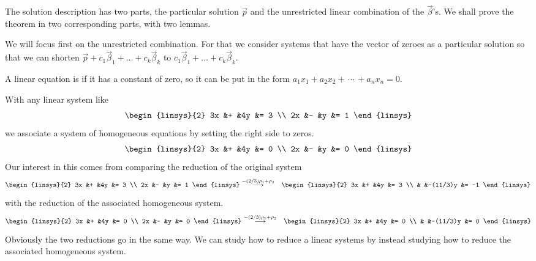 The solution description has two parts, 
the particular solution $\vec{p}$ 
and the unrestricted linear combination of the $\vec{\beta}$'s.
We shall prove the theorem in two corresponding parts, with two lemmas.

We will focus first on the unrestricted combination.
For that we consider systems that have the vector of zeroes
as a particular solution
so that we can shorten $\vec{p}+c_1\vec{\beta}_1+\dots+c_k\vec{\beta}_k$
to $c_1\vec{\beta}_1+\dots+c_k\vec{\beta}_k$.

\begin{definition}
A linear equation is %
 if it has a constant of zero, so
it can be put in the form $a_1x_1+a_2x_2+\,\cdots\,+a_nx_n=0$.
\end{definition}

\begin{example}  \label{ex:FirstExHomoSys}
With any linear system like
\begin{equation*}
  \begin{linsys}{2}
    3x  &+  &4y  &=  3  \\
    2x  &-  &y   &=  1  
  \end{linsys}
\end{equation*}
we associate a system of homogeneous equations by setting the right side to
zeros.
\begin{equation*}
  \begin{linsys}{2}
    3x  &+  &4y  &=  0  \\
    2x  &-  &y   &=  0  
  \end{linsys}
\end{equation*}
Our interest in this comes from 
comparing the reduction of the original system
\begin{eqnarray*}
  \begin{linsys}{2}
    3x  &+  &4y  &=  3  \\
    2x  &-  &y   &=  1  
  \end{linsys}
  &\grstep{-(2/3)\rho_1+\rho_2}
  &\begin{linsys}{2}
    3x  &+  &4y        &=  3  \\
        &   &-(11/3)y   &=  -1  
   \end{linsys}
\end{eqnarray*}
with the reduction of the associated homogeneous system.
\begin{eqnarray*}
  \begin{linsys}{2}
    3x  &+  &4y  &=  0  \\
    2x  &-  &y   &=  0  
  \end{linsys}
  &\grstep{-(2/3)\rho_1+\rho_2}
  &\begin{linsys}{2}
    3x  &+  &4y        &=  0  \\
        &   &-(11/3)y   &=  0
   \end{linsys}
\end{eqnarray*}
Obviously the two reductions go in the same way.
We can study how to reduce a linear systems by instead studying how
to reduce the associated homogeneous system.
\end{example}

